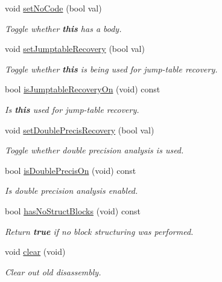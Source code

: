 \begin{DoxyCompactItemize}
void \mbox{\hyperlink{class_funcdata_aa9ac206ee7731d8f4db960f6daadc8b4}{set\+No\+Code}} (bool val)
\begin{DoxyCompactList}\small\item\em Toggle whether {\bfseries{this}} has a body. \end{DoxyCompactList}\item 
void \mbox{\hyperlink{class_funcdata_ac33bb4d59a0125d36710fe80453b9526}{set\+Jumptable\+Recovery}} (bool val)
\begin{DoxyCompactList}\small\item\em Toggle whether {\bfseries{this}} is being used for jump-\/table recovery. \end{DoxyCompactList}\item 
bool \mbox{\hyperlink{class_funcdata_a0f4f50447bca9f83a2a8923ff78f9983}{is\+Jumptable\+Recovery\+On}} (void) const
\begin{DoxyCompactList}\small\item\em Is {\bfseries{this}} used for jump-\/table recovery. \end{DoxyCompactList}\item 
void \mbox{\hyperlink{class_funcdata_a23bcddc7a3b959812f9a1660b39cc6ef}{set\+Double\+Precis\+Recovery}} (bool val)
\begin{DoxyCompactList}\small\item\em Toggle whether double precision analysis is used. \end{DoxyCompactList}\item 
bool \mbox{\hyperlink{class_funcdata_a34f5244a2b3edcf7276f0084f7b48281}{is\+Double\+Precis\+On}} (void) const
\begin{DoxyCompactList}\small\item\em Is double precision analysis enabled. \end{DoxyCompactList}\item 
bool \mbox{\hyperlink{class_funcdata_a6840fba2eb01394e02fed1d4b9f77b04}{has\+No\+Struct\+Blocks}} (void) const
\begin{DoxyCompactList}\small\item\em Return {\bfseries{true}} if no block structuring was performed. \end{DoxyCompactList}\item 
void \mbox{\hyperlink{class_funcdata_a25b616d10d9514eda69dd9d974c62eb8}{clear}} (void)
\begin{DoxyCompactList}\small\item\em Clear out old disassembly. \end{DoxyCompactList}\item 

\end{DoxyCompactItemize}

